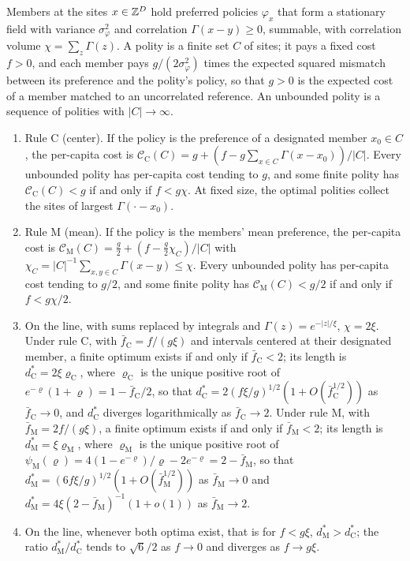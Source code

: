 \begin{proposition}\label{prop:abs-polity}
Members at the sites $x\in\mathbb{Z}^D$ hold preferred policies $\varphi_x$ that form a stationary field with variance $\sigma_\varphi^2$ and correlation $\Gamma(x-y)\ge0$, summable, with correlation volume $\chi=\sum_z\Gamma(z)$. A polity is a finite set $C$ of sites; it pays a fixed cost $f>0$, and each member pays $g/(2\sigma_\varphi^2)$ times the expected squared mismatch between its preference and the polity's policy, so that $g>0$ is the expected cost of a member matched to an uncorrelated reference. An unbounded polity is a sequence of polities with $\lvert C\rvert\to\infty$.
\begin{enumerate}
\item[(a)] Rule C (center). If the policy is the preference of a designated member $x_0\in C$, the per-capita cost is $\mathcal C_{\mathrm C}(C)=g+(f-g\sum_{x\in C}\Gamma(x-x_0))/\lvert C\rvert$. Every unbounded polity has per-capita cost tending to $g$, and some finite polity has $\mathcal C_{\mathrm C}(C)<g$ if and only if $f<g\chi$. At fixed size, the optimal polities collect the sites of largest $\Gamma(\cdot-x_0)$.
\item[(b)] Rule M (mean). If the policy is the members' mean preference, the per-capita cost is $\mathcal C_{\mathrm M}(C)=\frac g2+(f-\frac g2\chi_C)/\lvert C\rvert$ with $\chi_C=\lvert C\rvert^{-1}\sum_{x,y\in C}\Gamma(x-y)\le\chi$. Every unbounded polity has per-capita cost tending to $g/2$, and some finite polity has $\mathcal C_{\mathrm M}(C)<g/2$ if and only if $f<g\chi/2$.
\item[(c)] On the line, with sums replaced by integrals and $\Gamma(z)=e^{-\lvert z\rvert/\xi}$, $\chi=2\xi$. Under rule C, with $\bar f_{\mathrm C}=f/(g\xi)$ and intervals centered at their designated member, a finite optimum exists if and only if $\bar f_{\mathrm C}<2$; its length is $d^\ast_{\mathrm C}=2\xi\varrho_{\mathrm C}$, where $\varrho_{\mathrm C}$ is the unique positive root of $e^{-\varrho}(1+\varrho)=1-\bar f_{\mathrm C}/2$, so that $d^\ast_{\mathrm C}=2(f\xi/g)^{1/2}(1+O(\bar f_{\mathrm C}^{1/2}))$ as $\bar f_{\mathrm C}\to0$, and $d^\ast_{\mathrm C}$ diverges logarithmically as $\bar f_{\mathrm C}\to2$. Under rule M, with $\bar f_{\mathrm M}=2f/(g\xi)$, a finite optimum exists if and only if $\bar f_{\mathrm M}<2$; its length is $d^\ast_{\mathrm M}=\xi\varrho_{\mathrm M}$, where $\varrho_{\mathrm M}$ is the unique positive root of $\psi_{\mathrm M}(\varrho)=4(1-e^{-\varrho})/\varrho-2e^{-\varrho}=2-\bar f_{\mathrm M}$, so that $d^\ast_{\mathrm M}=(6f\xi/g)^{1/2}(1+O(\bar f_{\mathrm M}^{1/2}))$ as $\bar f_{\mathrm M}\to0$ and $d^\ast_{\mathrm M}=4\xi(2-\bar f_{\mathrm M})^{-1}(1+o(1))$ as $\bar f_{\mathrm M}\to2$.
\item[(d)] On the line, whenever both optima exist, that is for $f<g\xi$, $d^\ast_{\mathrm M}>d^\ast_{\mathrm C}$; the ratio $d^\ast_{\mathrm M}/d^\ast_{\mathrm C}$ tends to $\sqrt6/2$ as $f\to0$ and diverges as $f\to g\xi$.
\end{enumerate}
\end{proposition}
